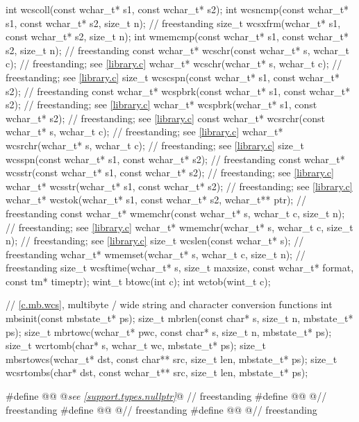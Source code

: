 \begin{codeblock}
{  int wcscoll(const wchar_t* s1, const wchar_t* s2);
  int wcsncmp(const wchar_t* s1, const wchar_t* s2, size_t n);          // freestanding
  size_t wcsxfrm(wchar_t* s1, const wchar_t* s2, size_t n);
  int wmemcmp(const wchar_t* s1, const wchar_t* s2, size_t n);          // freestanding
  const wchar_t* wcschr(const wchar_t* s, wchar_t c);                   // freestanding; see \ref{library.c}
  wchar_t* wcschr(wchar_t* s, wchar_t c);                               // freestanding; see \ref{library.c}
  size_t wcscspn(const wchar_t* s1, const wchar_t* s2);                 // freestanding
  const wchar_t* wcspbrk(const wchar_t* s1, const wchar_t* s2);         // freestanding; see \ref{library.c}
  wchar_t* wcspbrk(wchar_t* s1, const wchar_t* s2);                     // freestanding; see \ref{library.c}
  const wchar_t* wcsrchr(const wchar_t* s, wchar_t c);                  // freestanding; see \ref{library.c}
  wchar_t* wcsrchr(wchar_t* s, wchar_t c);                              // freestanding; see \ref{library.c}
  size_t wcsspn(const wchar_t* s1, const wchar_t* s2);                  // freestanding
  const wchar_t* wcsstr(const wchar_t* s1, const wchar_t* s2);          // freestanding; see \ref{library.c}
  wchar_t* wcsstr(wchar_t* s1, const wchar_t* s2);                      // freestanding; see \ref{library.c}
  wchar_t* wcstok(wchar_t* s1, const wchar_t* s2, wchar_t** ptr);       // freestanding
  const wchar_t* wmemchr(const wchar_t* s, wchar_t c, size_t n);        // freestanding; see \ref{library.c}
  wchar_t* wmemchr(wchar_t* s, wchar_t c, size_t n);                    // freestanding; see \ref{library.c}
  size_t wcslen(const wchar_t* s);                                      // freestanding
  wchar_t* wmemset(wchar_t* s, wchar_t c, size_t n);                    // freestanding
  size_t wcsftime(wchar_t* s, size_t maxsize, const wchar_t* format, const tm* timeptr);
  wint_t btowc(int c);
  int wctob(wint_t c);

  // \ref{c.mb.wcs}, multibyte / wide string and character conversion functions
  int mbsinit(const mbstate_t* ps);
  size_t mbrlen(const char* s, size_t n, mbstate_t* ps);
  size_t mbrtowc(wchar_t* pwc, const char* s, size_t n, mbstate_t* ps);
  size_t wcrtomb(char* s, wchar_t wc, mbstate_t* ps);
  size_t mbsrtowcs(wchar_t* dst, const char** src, size_t len, mbstate_t* ps);
  size_t wcsrtombs(char* dst, const wchar_t** src, size_t len, mbstate_t* ps);
}

#define @@ @\textit{see \ref{support.types.nullptr}}@                                                  // freestanding
#define @@ @\seebelow@                                             // freestanding
#define @@ @\seebelow@                                             // freestanding
#define @@ @\seebelow@                                                  // freestanding
\end{codeblock}

